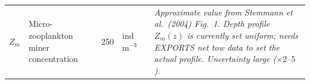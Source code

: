 \documentclass[11pt,a4paper]{article}
\newcommand{\conf}[1]{\textit{#1}}
\begin{document}
\begin{longtable}{L{2cm} L{5.5cm} C{3cm} L{3.5cm} L{5cm} L{6cm}}
$Z_m$ &
Micro-zooplankton miner concentration &
250 &
ind\,m$^{-3}$ &
\citet{stemmann2004a} &
\conf{Approximate value from Stemmann et al.\ (2004) Fig.~1. Depth profile $Z_m(z)$ is currently set uniform; needs EXPORTS net tow data to set the actual profile. Uncertainty large ($\times 2$--$5$).} \\[6pt]

\end{longtable}



\end{document}
